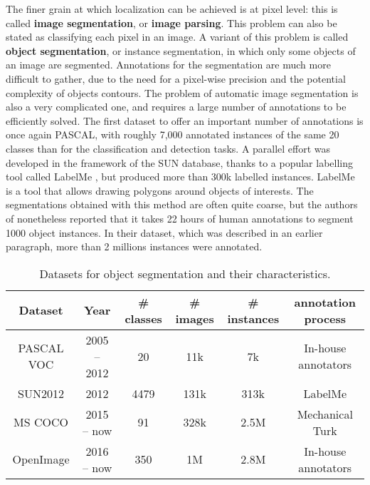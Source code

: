 The finer grain at which localization can be achieved is at pixel level: this is called \textbf{image segmentation}, or \textbf{image parsing}. This problem can also be stated as classifying each pixel in an image. A variant of this problem is called \textbf{object segmentation}, or instance segmentation, in which only some objects of an image are segmented. Annotations for the segmentation are much more difficult to gather, due to the need for a pixel-wise precision and the potential complexity of objects contours. The problem of automatic image segmentation is also a very complicated one, and requires a large number of annotations to be efficiently solved. The first dataset to offer an important number of annotations is once again PASCAL, with roughly 7,000 annotated instances of the same 20 classes than for the classification and detection tasks. A parallel effort was developed in the framework of the SUN database, thanks to a popular labelling tool called LabelMe \cite{russell2008labelme}, but produced more than 300k labelled instances. LabelMe is a tool that allows drawing polygons around objects of interests. The segmentations obtained with this method are often quite coarse, but the authors of \cite{chen2015microsoft} nonetheless reported that it takes 22 hours of human annotations to segment 1000 object instances. In their dataset, which was described in an earlier paragraph, more than 2 millions instances were annotated. 

\vspace{0.5cm}

\begin{table}
	\centering
	\caption{Datasets for object segmentation and their characteristics.}
	\begin{tabular}{|c|c|c|c|c|c|}
		\hline
		Dataset & Year & \# classes & \# images & \# instances & annotation process \\
		\hline
		PASCAL VOC \cite{Everingham10} & 2005 -- 2012 & 20 & 11k & 7k & In-house annotators \\
		SUN2012 \cite{xiao2010sun} & 2012 & 4479 & 131k & 313k & LabelMe \cite{russell2008labelme,barriuso2012notes} \\
		MS COCO \cite{chen2015microsoft} & 2015 -- now & 91 & 328k & 2.5M & Mechanical Turk \\
		OpenImage \cite{OpenImages, OpenImages2} & 2016 -- now & 350 & 1M & 2.8M & In-house annotators \\
		\hline
	\end{tabular}
	\label{tab:segmentation_ds}
\end{table}
\vspace{0.5cm}


